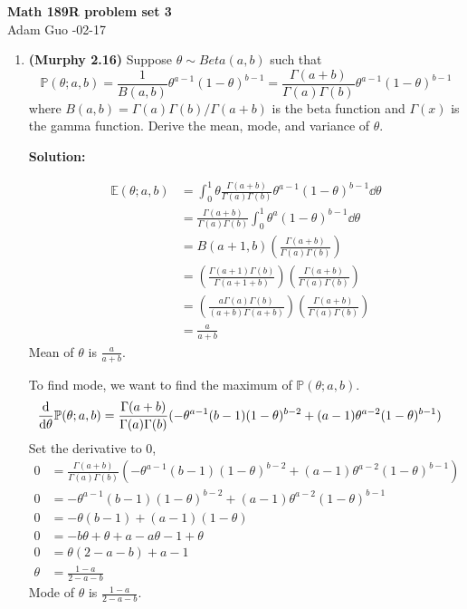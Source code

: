 \documentclass[letter,11pt]{article}
\newenvironment{solution}{
    \vspace{0.16in} {\bf Solution:}
    
}{
	\vspace{0.16in}
}
\begin{document}
\begin{center}
    {\bf \Large Math 189R problem set 3} \\
    \vspace{0.1in}
    Adam Guo -02-17
\end{center}

\begin{enumerate}
    \item \textbf{(Murphy 2.16)} Suppose $\theta \sim Beta(a, b)$ such that
    \[\mathbb{P}(\theta; a, b) = \frac{1}{B(a, b)} \theta^{a - 1} (1 - \theta)^{b - 1} = \frac{\Gamma(a + b)}{\Gamma(a) \Gamma(b)} \theta^{a - 1} (1 - \theta)^{b - 1}\]
    where $B(a, b) = \Gamma(a) \Gamma(b) / \Gamma(a + b)$ is the beta function and $\Gamma(x)$ is the gamma function. Derive the mean, mode, and variance of $\theta$.

    \begin{solution}
        \begin{align*}
            \mathbb{E}(\theta; a, b) &= \int_{0}^1 \theta \frac{\Gamma(a + b)}{\Gamma(a) \Gamma(b)} \theta^{a - 1} (1 - \theta)^{b - 1} \dd{\theta} \\
                &= \frac{\Gamma(a + b)}{\Gamma(a) \Gamma(b)} \int_0^1 \theta^a (1 - \theta)^{b-1} \dd{\theta} \\
                &= B(a + 1, b) \left(\frac{\Gamma(a + b)}{\Gamma(a) \Gamma(b)}\right) \\
                &= \left(\frac{\Gamma(a + 1)\Gamma(b)}{\Gamma(a + 1 + b)}\right) \left(\frac{\Gamma(a + b)}{\Gamma(a) \Gamma(b)}\right) \\
                &= \left(\frac{a \Gamma(a)\Gamma(b)}{(a + b)\Gamma(a + b)}\right) \left(\frac{\Gamma(a + b)}{\Gamma(a) \Gamma(b)}\right) \\
                &= \frac{a}{a + b}
        \end{align*}
        Mean of $\theta$ is $\frac{a}{a + b}$.

        To find mode, we want to find the maximum of $\mathbb{P}(\theta; a, b)$.
        \begin{align*}
            \dv{\theta} \mathbb{P}(\theta; a, b) &= \frac{\Gamma(a + b)}{\Gamma(a) \Gamma(b)} (-\theta^{a - 1} (b - 1) (1 - \theta)^{b - 2} + (a - 1) \theta^{a - 2} (1 - \theta)^{b - 1})
        \end{align*}
        Set the derivative to 0,
        \begin{align*}
            0 &= \frac{\Gamma(a + b)}{\Gamma(a) \Gamma(b)} (-\theta^{a - 1} (b - 1) (1 - \theta)^{b - 2} + (a - 1) \theta^{a - 2} (1 - \theta)^{b - 1}) \\
            0 &= -\theta^{a - 1} (b - 1) (1 - \theta)^{b - 2} + (a - 1) \theta^{a - 2} (1 - \theta)^{b - 1} \\
            0 &= -\theta(b-1) + (a-1)(1-\theta) \\
            0 &= -b\theta + \theta + a - a\theta - 1 + \theta \\
            0 &= \theta(2 - a - b) + a - 1 \\
            \theta &= \frac{1 - a}{2 - a - b}
        \end{align*}
        Mode of $\theta$ is $\frac{1 - a}{2 - a - b}$.


\end{solution}
\end{enumerate}
\end{document}
